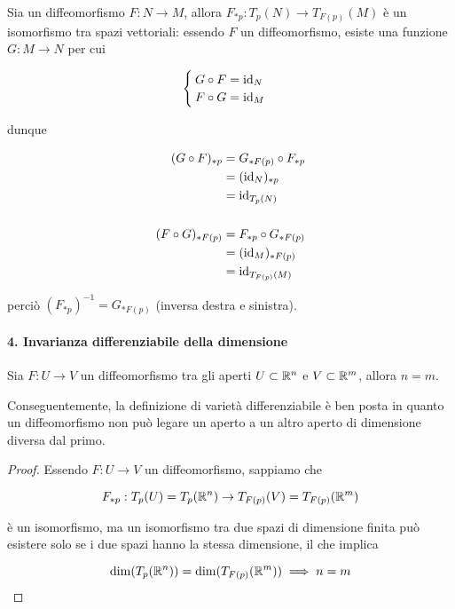Sia un diffeomorfismo $ F : N \to M $, allora $ F_{*p} : T_{p}(N) \to T_{F(p)}(M) $ è un isomorfismo tra spazi vettoriali: essendo $ F $ un diffeomorfismo, esiste una funzione $ G : M \to N $ per cui

\begin{equation}
	\begin{cases}
		G \circ F = \operatorname{id}_{N}\\
		F \circ G = \operatorname{id}_{M}
	\end{cases}
\end{equation}

dunque
	
\begin{align}
	\begin{split}
		(G \circ F)_{*p} &= G_{*F(p)} \circ F_{*p}\\
		&= (\operatorname{id}_{N})_{*p}\\
		&= \operatorname{id}_{T_{p}(N)}\\\\
		(F \circ G)_{*F(p)} &= F_{*p} \circ G_{*F(p)}\\
		&= (\operatorname{id}_{M})_{*F(p)}\\
		&= \operatorname{id}_{T_{F(p)}(M)}
	\end{split}
\end{align}

perciò $ (F_{*p})^{-1} = G_{*F(p)} $ (inversa destra e sinistra).

\paragraph{4. Invarianza differenziabile della dimensione}

\begin{theorem}
	Sia $ F : U \to V $ un diffeomorfismo tra gli aperti $ U \subset \mathbb{R}^{n} $ e $ V \subset \mathbb{R}^{m} $, allora $ n = m $.
\end{theorem}

Conseguentemente, la definizione di varietà differenziabile è ben posta in quanto un diffeomorfismo non può legare un aperto a un altro aperto di dimensione diversa dal primo.

\begin{proof}
	Essendo $ F : U \to V $ un diffeomorfismo, sappiamo che
	
	\begin{equation}
		F_{*p} : T_{p}(U) = T_{p}(\mathbb{R}^{n}) \to T_{F(p)}(V) = T_{F(p)}(\mathbb{R}^{m})
	\end{equation}

	è un isomorfismo, ma un isomorfismo tra due spazi di dimensione finita può esistere solo se i due spazi hanno la stessa dimensione, il che implica
	
	\begin{equation}
		\dim(T_{p}(\mathbb{R}^{n})) = \dim(T_{F(p)}(\mathbb{R}^{m})) \implies n = m
	\end{equation}
\end{proof}

